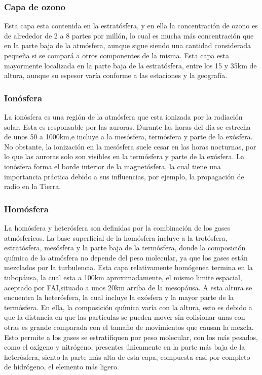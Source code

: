\documentclass{article}
\begin{document}
\subsubsection {Capa de ozono}
Esta capa esta contenida en la estratósfera, y en ella la concentración de ozono es de alrededor de 2 a 8 partes por millón, lo cual es mucha más concentración que en la parte baja de la atmósfera, aunque sigue siendo una cantidad considerada pequeña si se compará a otros componentes de la misma. Esta capa esta mayormente localizada en la parte baja de la estratósfera, entre los 15 y 35km de altura, aunque su espesor varía conforme a las estaciones y la geografía.

\subsubsection {Ionósfera}
La ionósfera es una región de la atmósfera que esta ionizada por la radiación solar. Esta es responsable por las auroras. Durante las horas del día se estrecha de unos 50 a 1000km,e incluye a la mesósfera, termósfera y parte de la exósfera. No obstante, la ionización en la mesósfera suele cesar en las horas nocturnas, por lo que las auroras solo son visibles en la termósfera y parte de la exósfera.
La ionósfera forma el borde interior de la magnetósfera, la cual tiene una importancia práctica debido a sus influencias, por ejemplo, la propagación de radio en la Tierra.

\subsubsection {Homósfera}
La homósfera y heterósfera son definidas por la combinación de los gases atmósfericos. La base superficial de la homósfera incluye a la trotósfera, estratósfera, mesósfera y la parte baja de la termósfera, donde la composición química de la atmósfera no depende del peso molecular, ya que los gases están mezclados por la turbulencia. Esta capa relativamente homógenea termina en la tubopáusa, la cual esta a 100km aproximadamente, el mismo limite espacial, aceptado por FAI,situado a unos 20km arriba de la mesopáusa.
A esta altura se encuentra la heterósfera, la cual incluye la exósfera y la mayor parte de la termósfera. En ella, la composición química varía con la altura, esto es debido a que la distancia en que las partículas se pueden mover sin colisionar unas con otras es grande comparada con el tamaño de movimientos que causan la mezcla. Esto permite a los gases se estratifiquen por peso molecular, con los más pesados, como el oxígeno y nitrógeno, presentes únicamente en la parte más baja de la heterósfera, siento la parte más alta de esta capa, compuesta casi por completo de hidrógeno, el elemento más ligero.
\end{document}
